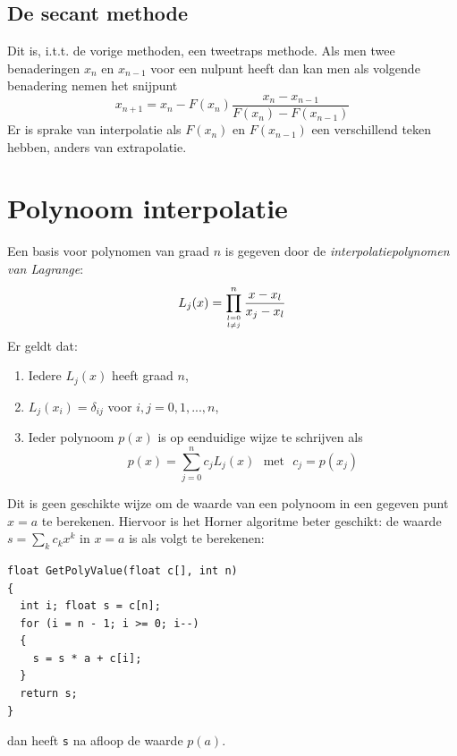 \documentclass[twoside]{report}
\begin{document}
\subsection{De secant methode}
Dit is, i.t.t. de vorige methoden, een tweetraps methode. Als men twee
benaderingen $x_n$ en $x_{n-1}$ voor een nulpunt heeft dan kan men als
volgende benadering nemen het snijpunt
\[
x_{n+1}=x_n-F(x_n)\frac{x_n-x_{n-1}}{F(x_n)-F(x_{n-1})}
\]
Er is sprake van interpolatie als $F(x_n)$ en $F(x_{n-1})$ een verschillend
teken hebben, anders van extrapolatie.

\section{Polynoom interpolatie}
Een basis voor polynomen van graad $n$ is gegeven door de
{\it interpolatiepolynomen van Lagrange}:
\[
L_j(x)=\prod_{{l=0}\atop{l\neq j}}^n\frac{x-x_l}{x_j-x_l}
\]
Er geldt dat:
\begin{enumerate}
\item Iedere $L_j(x)$ heeft graad $n$,
\item $L_j(x_i)=\delta_{ij}$ voor $i,j=0,1,...,n$,
\item Ieder polynoom $p(x)$ is op eenduidige wijze te schrijven als
\[
p(x)=\sum_{j=0}^n c_jL_j(x)~~~\mbox{met}~~~c_j=p(x_j)
\]
\end{enumerate}
Dit is geen geschikte wijze om de waarde van een polynoom in een gegeven punt
$x=a$ te berekenen. Hiervoor is het Horner algoritme beter geschikt: de
waarde $s=\sum_k c_kx^k$ in $x=a$ is als volgt te berekenen:
\begin{verbatim}
float GetPolyValue(float c[], int n)
{
  int i; float s = c[n];
  for (i = n - 1; i >= 0; i--)
  {
    s = s * a + c[i];
  }
  return s;
}
\end{verbatim}
dan heeft {\tt s} na afloop de waarde $p(a)$.
\end{document}
